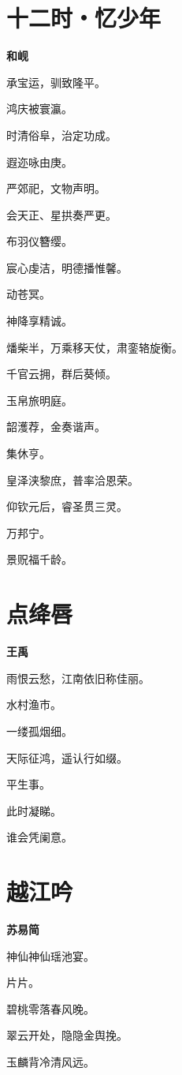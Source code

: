 \documentclass[12pt,a4paper]{ctexbook}
\begin{document}
\section{十二时・忆少年}
\textbf{和岘}\par\vspace{0.5em}
承宝运，驯致隆平。\par
鸿庆被寰瀛。\par
时清俗阜，治定功成。\par
遐迩咏由庚。\par
严郊祀，文物声明。\par
会天正、星拱奏严更。\par
布羽仪簪缨。\par
宸心虔洁，明德播惟馨。\par
动苍冥。\par
神降享精诚。\par
燔柴半，万乘移天仗，肃銮辂旋衡。\par
千官云拥，群后葵倾。\par
玉帛旅明庭。\par
韶濩荐，金奏谐声。\par
集休亨。\par
皇泽浃黎庶，普率洽恩荣。\par
仰钦元后，睿圣贯三灵。\par
万邦宁。\par
景贶福千龄。\par

\section{点绛唇}
\textbf{王禹}\par\vspace{0.5em}
雨恨云愁，江南依旧称佳丽。\par
水村渔市。\par
一缕孤烟细。\par
天际征鸿，遥认行如缀。\par
平生事。\par
此时凝睇。\par
谁会凭阑意。\par

\section{越江吟}
\textbf{苏易简}\par\vspace{0.5em}
神仙神仙瑶池宴。\par
片片。\par
碧桃零落春风晚。\par
翠云开处，隐隐金舆挽。\par
玉麟背冷清风远。\par
\end{document}
